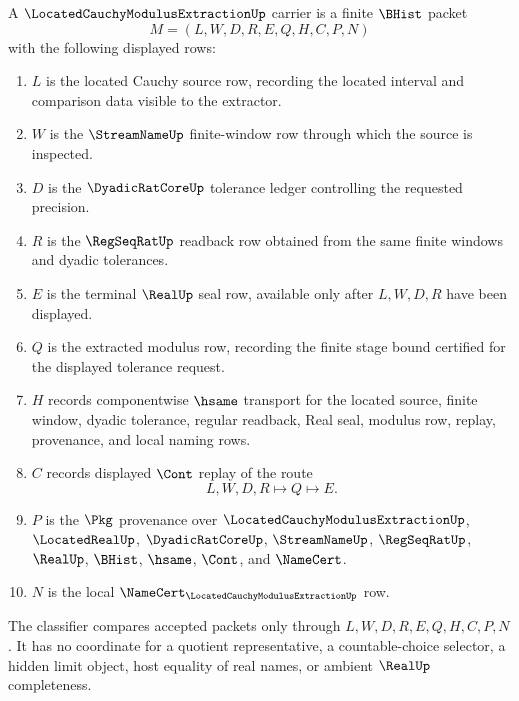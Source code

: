\begin{definition}
\label{def:located-cauchy-modulus-extraction-carrier}
A $\LocatedCauchyModulusExtractionUp$ carrier is a finite $\BHist$ packet
$$
M=(L,W,D,R,E,Q,H,C,P,N)
$$
with the following displayed rows:
\begin{enumerate}
\item $L$ is the located Cauchy source row, recording the located interval and comparison data visible to the extractor.
\item $W$ is the $\StreamNameUp$ finite-window row through which the source is inspected.
\item $D$ is the $\DyadicRatCoreUp$ tolerance ledger controlling the requested precision.
\item $R$ is the $\RegSeqRatUp$ readback row obtained from the same finite windows and dyadic tolerances.
\item $E$ is the terminal $\RealUp$ seal row, available only after $L,W,D,R$ have been displayed.
\item $Q$ is the extracted modulus row, recording the finite stage bound certified for the displayed tolerance request.
\item $H$ records componentwise $\hsame$ transport for the located source, finite window, dyadic tolerance, regular readback, Real seal, modulus row, replay, provenance, and local naming rows.
\item $C$ records displayed $\Cont$ replay of the route
$$
L,W,D,R \longmapsto Q \longmapsto E .
$$
\item $P$ is the $\Pkg$ provenance over $\LocatedCauchyModulusExtractionUp$, $\LocatedRealUp$, $\DyadicRatCoreUp$, $\StreamNameUp$, $\RegSeqRatUp$, $\RealUp$, $\BHist$, $\hsame$, $\Cont$, and $\NameCert$.
\item $N$ is the local $\NameCert_{\LocatedCauchyModulusExtractionUp}$ row.
\end{enumerate}
The classifier compares accepted packets only through $L,W,D,R,E,Q,H,C,P,N$. It has no coordinate for a quotient representative, a countable-choice selector, a hidden limit object, host equality of real names, or ambient $\RealUp$ completeness.
\end{definition}

